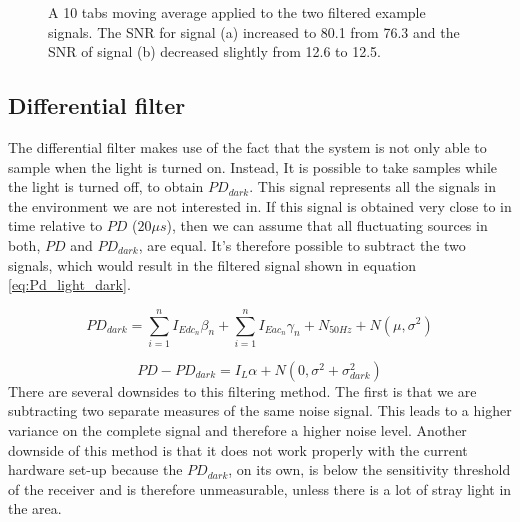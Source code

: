 \begin{figure}
	\centering     %
	\label{movavg_example}
	\caption{A 10 tabs moving average applied to the two filtered example signals. The SNR for signal (a) increased to 80.1 from 76.3 and the SNR of signal (b) decreased slightly from 12.6 to 12.5.}
\end{figure}

\subsection{Differential filter}
The differential filter makes use of the fact that the system is not only able to sample when the light is turned on. Instead, It is possible to take samples while the light is turned off, to obtain $PD_{dark}$. This signal represents all the signals in the environment we are not interested in. If this signal is obtained very close to in time relative to $PD$ ($20\mu s$), then we can assume that all fluctuating sources in both, $PD$ and $PD_{dark}$, are equal. It's therefore possible to subtract the two signals, which would result in the filtered signal shown in equation \ref{eq:Pd_light_dark}.

\begin{equation}
\label{eq:Pd_dark}
PD_{dark} = \sum_{i=1}^n I_{Edc_{n}} \beta_{n} + \sum_{i=1}^n I_{Eac{_n}} \gamma_{n} + N_{50Hz} + N(\mu,\sigma^2)
\end{equation}

\begin{equation}
\label{eq:Pd_light_dark}
PD - PD_{dark} = I_{L} \alpha + N(0,\sigma^2 + \sigma^2_{dark})
\end{equation}
There are several downsides to this filtering method. The first is that we are subtracting two separate measures of the same noise signal. This leads to a higher variance on the complete signal and therefore a higher noise level. Another downside of this method is that it does not work properly with the current hardware set-up because the $PD_{dark}$, on its own, is below the sensitivity threshold of the receiver and is therefore unmeasurable, unless there is a lot of stray light in the area.


